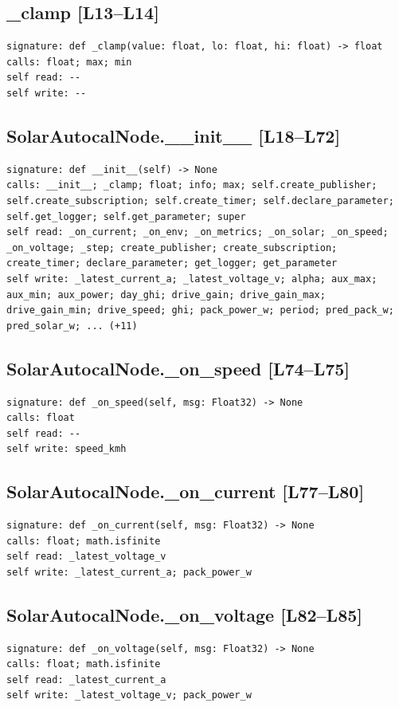 \documentclass[a4paper,10pt,oneside]{book}
\begin{document}
\subsection*{\_clamp [L13--L14]}
\begin{lstlisting}[numbers=none]
signature: def _clamp(value: float, lo: float, hi: float) -> float
calls: float; max; min
self read: --
self write: --
\end{lstlisting}
\subsection*{SolarAutocalNode.\_\_init\_\_ [L18--L72]}
\begin{lstlisting}[numbers=none]
signature: def __init__(self) -> None
calls: __init__; _clamp; float; info; max; self.create_publisher; self.create_subscription; self.create_timer; self.declare_parameter; self.get_logger; self.get_parameter; super
self read: _on_current; _on_env; _on_metrics; _on_solar; _on_speed; _on_voltage; _step; create_publisher; create_subscription; create_timer; declare_parameter; get_logger; get_parameter
self write: _latest_current_a; _latest_voltage_v; alpha; aux_max; aux_min; aux_power; day_ghi; drive_gain; drive_gain_max; drive_gain_min; drive_speed; ghi; pack_power_w; period; pred_pack_w; pred_solar_w; ... (+11)
\end{lstlisting}
\subsection*{SolarAutocalNode.\_on\_speed [L74--L75]}
\begin{lstlisting}[numbers=none]
signature: def _on_speed(self, msg: Float32) -> None
calls: float
self read: --
self write: speed_kmh
\end{lstlisting}
\subsection*{SolarAutocalNode.\_on\_current [L77--L80]}
\begin{lstlisting}[numbers=none]
signature: def _on_current(self, msg: Float32) -> None
calls: float; math.isfinite
self read: _latest_voltage_v
self write: _latest_current_a; pack_power_w
\end{lstlisting}
\subsection*{SolarAutocalNode.\_on\_voltage [L82--L85]}
\begin{lstlisting}[numbers=none]
signature: def _on_voltage(self, msg: Float32) -> None
calls: float; math.isfinite
self read: _latest_current_a
self write: _latest_voltage_v; pack_power_w
\end{lstlisting}
\end{document}

